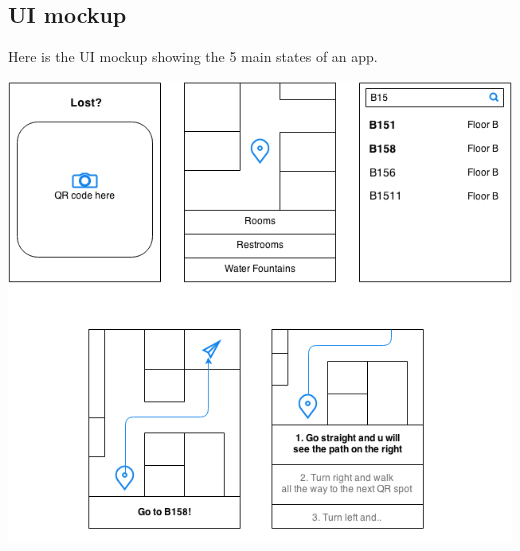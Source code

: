 \documentclass[12pt]{article}
\begin{document}
\newpage
\subsection{UI mockup}
Here is the UI mockup showing the 5 main states of an app.

\begin{center}
\includegraphics[scale=0.6]{image/image03.png}
\end{center}
\end{document}
